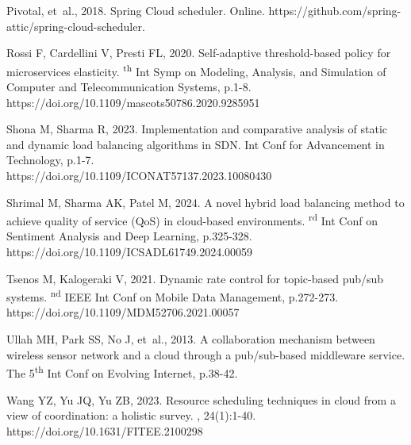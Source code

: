 \documentclass[twoside,twocolumn]{article}
\begin{document}
\begin{thebibliography}{}
Pivotal, {et~al.}, 2018.
\newblock Spring Cloud scheduler.
\newblock Online. https://github.com/spring-attic/spring-cloud-scheduler.


Rossi F, Cardellini V, Presti FL, 2020.
\newblock Self-adaptive threshold-based policy for microservices elasticity.
\textsuperscript{th} Int Symp on Modeling, Analysis, and Simulation of Computer and Telecommunication Systems, p.1-8. \\
https://doi.org/10.1109/mascots50786.2020.9285951


Shona M, Sharma R, 2023.
\newblock Implementation and comparative analysis of static and dynamic load balancing algorithms in SDN.
\newblock Int Conf for Advancement in Technology, p.1-7. \\
https://doi.org/10.1109/ICONAT57137.2023.10080430


Shrimal M, Sharma AK, Patel M, 2024.
\newblock A novel hybrid load balancing method to achieve quality of service (QoS) in cloud-based environments.
\textsuperscript{rd} Int Conf on Sentiment Analysis and Deep Learning, p.325-328. \\
https://doi.org/10.1109/ICSADL61749.2024.00059


Tsenos M, Kalogeraki V, 2021.
\newblock Dynamic rate control for topic-based pub/sub systems.
\textsuperscript{nd} IEEE Int Conf on Mobile Data Management, p.272-273. \\
https://doi.org/10.1109/MDM52706.2021.00057


Ullah MH, Park SS, No J, {et~al.}, 2013.
\newblock A collaboration mechanism between wireless sensor network and a cloud through a pub/sub-based middleware service.
\newblock The 5\textsuperscript{th} Int Conf on Evolving Internet, p.38-42.


Wang YZ, Yu JQ, Yu ZB, 2023.
\newblock Resource scheduling techniques in cloud from a view of coordination: a holistic survey.
, 24(1):1-40. \\
https://doi.org/10.1631/FITEE.2100298



\end{thebibliography}
\end{document}
